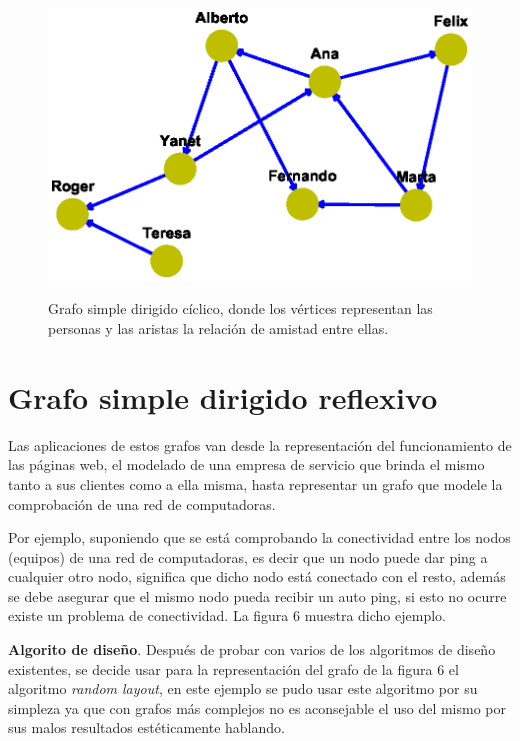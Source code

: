 \documentclass{article}
\begin{document}
\begin{figure}[h]
\begin{center}
\includegraphics[scale=0.7]{Graf5_kamada_kawai_layout.eps}\\
\caption{Grafo simple dirigido cíclico, donde los vértices representan las personas y las aristas la relación de amistad entre ellas. }
\end{center}
\end{figure}

\newpage

\section{Grafo simple dirigido reflexivo}

Las aplicaciones de estos grafos van desde la representación del funcionamiento de las páginas web, el modelado de una empresa de servicio que brinda el mismo tanto a sus clientes como a ella misma, hasta representar un grafo que modele la comprobación de una red de computadoras.

Por ejemplo, suponiendo que se está comprobando la conectividad entre los nodos (equipos) de una red de computadoras, es decir que un nodo puede dar ping a cualquier otro nodo, significa que dicho nodo está conectado con el resto, además se debe asegurar que el mismo nodo pueda recibir un auto ping, si esto no ocurre existe un problema de conectividad. La figura 6 muestra dicho ejemplo.

\textbf{Algorito de diseño}.
Después de probar con varios de los algoritmos de diseño existentes, se decide usar para la representación del grafo de la figura 6 el algoritmo \textit{random layout}, en este ejemplo se pudo usar este algoritmo por su simpleza ya que con grafos más complejos no es aconsejable el uso del mismo por sus malos resultados estéticamente hablando.
\end{document}
